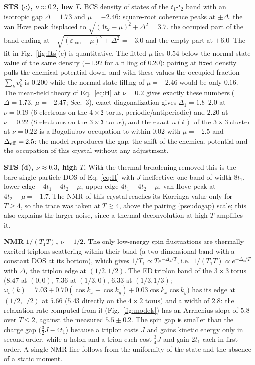 \documentclass[11pt]{article}
\newcommand{\nuh}{\nu=1/2}
\newcommand{\nut}{\nu\approx0.3}
\newcommand{\nutw}{\nu\approx0.2}
\begin{document}
\textbf{STS (c), $\nutw$, low $T$.} BCS density of states of the $t_1$-$t_2$ band with an isotropic gap $\Delta=1.73$ and $\mu=-2.46$: square-root coherence peaks at $\pm\Delta$, the van Hove peak displaced to $\sqrt{(4t_2-\mu)^2+\Delta^2}=3.7$, the occupied part of the band ending at $-\sqrt{(\varepsilon_{\min}-\mu)^2+\Delta^2}=-3.0$ and the empty part at $+6.0$. The fit in Fig.~\ref{fig:fits}(c) is quantitative. The fitted $\mu$ lies $0.54$ below the normal-state value of the same density ($-1.92$ for a filling of $0.20$): pairing at fixed density pulls the chemical potential down, and with these values the occupied fraction $\sum_kv_k^2$ is $0.200$ while the normal-state filling of $\mu=-2.46$ would be only $0.16$. The mean-field theory of Eq.~\eqref{eq:H} at $\nu=0.2$ gives exactly these numbers ($\Delta=1.73$, $\mu=-2.47$; Sec.~3), exact diagonalization gives $\Delta_1=1.8$--$2.0$ at $\nu=0.19$ (6 electrons on the $4\times2$ torus, periodic/antiperiodic) and $2.20$ at $\nu=0.22$ (8 electrons on the $3\times3$ torus), and the exact $n(k)$ of the $3\times3$ cluster at $\nu=0.22$ is a Bogoliubov occupation to within $0.02$ with $\mu=-2.5$ and $\Delta_{\rm eff}=2.5$: the model reproduces the gap, the shift of the chemical potential and the occupation of this crystal without any adjustment.

\textbf{STS (d), $\nut$, high $T$.} With the thermal broadening removed this is the bare single-particle DOS of Eq.~\eqref{eq:H} with $J$ ineffective: one band of width $8t_1$, lower edge $-4t_1-4t_2-\mu$, upper edge $4t_1-4t_2-\mu$, van Hove peak at $4t_2-\mu=+1.7$. The NMR of this crystal reaches its Korringa value only for $T\ge4$, so the trace was taken at $T\gtrsim4$, above the pairing (pseudogap) scale; this also explains the larger noise, since a thermal deconvolution at high $T$ amplifies it.

\textbf{NMR $1/(T_1T)$, $\nuh$.} The only low-energy spin fluctuations are thermally excited triplons scattering within their band (a two-dimensional band with a constant DOS at its bottom), which gives $1/T_1\propto T e^{-\Delta_s/T}$, i.e.\ $1/(T_1T)\propto e^{-\Delta_s/T}$ with $\Delta_s$ the triplon edge at $(1/2,1/2)$. The ED triplon band of the $3\times3$ torus ($8.47$ at $(0,0)$, $7.36$ at $(1/3,0)$, $6.33$ at $(1/3,1/3)$; $\omega_t(k)=7.03+0.70(\cos k_x+\cos k_y)+0.03\cos k_x\cos k_y$) has its edge at $(1/2,1/2)$ at $5.66$ ($5.43$ directly on the $4\times2$ torus) and a width of $2.8$; the relaxation rate computed from it (Fig.~\ref{fig:models}) has an Arrhenius slope of $5.8$ over $T\le2$, against the measured $5.5\pm0.2$. The spin gap is smaller than the charge gap ($\tfrac32J-4t_1$) because a triplon costs $J$ and gains kinetic energy only in second order, while a holon and a trion each cost $\tfrac34J$ and gain $2t_1$ each in first order. A single NMR line follows from the uniformity of the state and the absence of a static moment.
\end{document}
